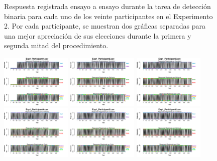 \begin{figure}[th]
\caption[Response_Exp2]{Respuesta registrada ensayo a ensayo durante la tarea de detección binaria para cada uno de los veinte participantes en el Experimento 2. Por cada participante, se muestran dos gráficas separadas para una mejor apreciación de sus elecciones durante la primera y segunda mitad del procedimiento.}
\label{fig:Response_E2}
\end{figure}

\begin{figure}[th]
\centering
\includegraphics[width=0.30\textwidth]{Figures/BiasResp_Exp1_P1} \includegraphics[width=0.30\textwidth]{Figures/BiasResp_Exp1_P2} \includegraphics[width=0.30\textwidth]{Figures/BiasResp_Exp1_P3}
\includegraphics[width=0.30\textwidth]{Figures/BiasResp_Exp1_P4} \includegraphics[width=0.30\textwidth]{Figures/BiasResp_Exp1_P5} \includegraphics[width=0.30\textwidth]{Figures/BiasResp_Exp1_P6}

\end{figure}
